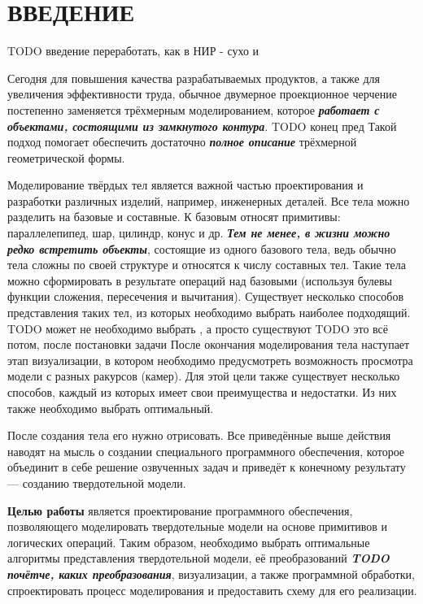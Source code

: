 \section*{ВВЕДЕНИЕ}

TODO введение переработать, как в НИР - сухо и

Сегодня для повышения качества разрабатываемых продуктов, а также для увеличения эффективности труда, обычное двумерное проекционное черчение постепенно заменяется трёхмерным моделированием, которое\textbf{\textit{ работает с объектами, состоящими из замкнутого контура}}. TODO конец пред
Такой подход помогает обеспечить достаточно \textbf{\textit{полное описание}} трёхмерной геометрической формы.


Моделирование твёрдых тел является важной частью проектирования и разработки различных изделий, например, инженерных деталей. 
Все тела можно разделить на базовые и составные. 
К базовым относят примитивы: параллелепипед, шар, цилиндр, конус и др. 
\textit{\textbf{Тем не менее, в жизни можно редко встретить объекты}}, состоящие из одного базового тела, ведь обычно тела сложны по своей структуре и относятся к числу составных тел. 
Такие тела можно сформировать в результате операций над базовыми (используя булевы функции сложения, пересечения и вычитания). 
Существует несколько способов представления таких тел, из которых необходимо выбрать наиболее подходящий. TODO может не необходимо выбрать , а просто существуют
TODO это всё потом, после постановки задачи
После окончания моделирования тела наступает этап визуализации, в котором необходимо предусмотреть возможность просмотра модели с разных ракурсов (камер). 
Для этой цели также существует несколько способов, каждый из которых имеет свои преимущества и недостатки. 
Из них также необходимо выбрать оптимальный.

После создания тела его нужно отрисовать. 
Все приведённые выше действия наводят на мысль о создании специального программного обеспечения, которое объединит в себе решение озвученных задач и приведёт к конечному результату --- созданию твердотельной модели.

\textbf{Целью работы} является проектирование программного обеспечения, позволяющего моделировать твердотельные модели на основе примитивов и логических операций. 
Таким образом, необходимо выбрать оптимальные алгоритмы представления твердотельной модели, её преобразований \textit{\textbf{TODO почётче, каких преобразования}}, визуализации, а также программной обработки, спроектировать процесс моделирования и предоставить схему для его реализации. 
\pagebreak